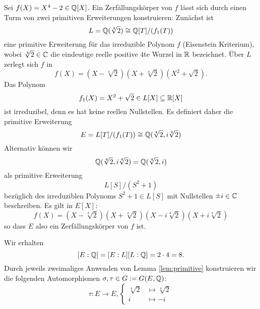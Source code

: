 \documentclass{book}
\begin{document}
\begin{exa}
    \label{exa:x42}
    Sei $f(X) = X^4 - 2 \in \mathbb{Q}[X]$. Ein Zerfällungskörper von $f$ lässt sich
    durch einen Turm von zwei primitiven Erweiterungen konstruieren: Zunächst
    ist 
    \[
        L = \mathbb{Q}(\sqrt[4]{2}) \cong \mathbb{Q}[T]/(f_1(T))
    \]
    eine primitive Erweiterung für das irreduzible Polynom $f$
    (Eisenstein Kriterium), wobei $\sqrt[4]{2} \in \mathbb{C}$ die eindeutige reelle
    positive $4$te Wurzel in $\mathbb{R}$ bezeichnet. Über $L$ zerlegt sich $f$ in 
    \[
        f(X) = (X - \sqrt[4]{2})(X + \sqrt[4]{2}) (X^{2} + \sqrt{2}).
    \]
    Das Polynom 
    \[
        f_1(X) = X^{2} + \sqrt{2} \in L[X] \subseteq \mathbb{R}[X]
    \]
    ist irreduzibel, denn es hat keine reellen Nullstellen. Es definiert daher die primitive Erweiterung
    \[
        E = L[T]/(f_1(T)) \cong \mathbb{Q}(\sqrt[4]{2}, i\sqrt[4]{2})
    \]
    Alternativ können wir 
    \[
        \mathbb{Q}(\sqrt[4]{2}, i\sqrt[4]{2}) = \mathbb{Q}(\sqrt[4]{2}, i)
    \]
    als primitive Erweiterung 
    \[
        L[S]/(S^2 + 1) 
    \]
    bezüglich des irreduziblen Polynoms $S^2 + 1 \in L[S]$ mit
    Nullstellen $\pm i \in \mathbb{C}$ beschreiben. Es gilt in $E[X]$:
    \[
        f(X) = (X - \sqrt[4]{2})(X + \sqrt[4]{2}) (X - i\sqrt[4]{2})(X + i\sqrt[4]{2})
    \]
    so dass $E$ also ein Zerfällungskörper von $f$ ist. 

    Wir erhalten 
    \[
        [E: \mathbb{Q}] = [E: L][L:\mathbb{Q}] = 2 \cdot 4 = 8.
    \]
    Durch jeweils zweimaliges Anwenden von Lemma \ref{lem:primitive}
    konstruieren wir die folgenden Automorphismen
    $\sigma,\tau \in G := G(E, \mathbb{Q})$:
    \[
        \tau: E \to E, \begin{cases} \sqrt[4]{2} & \mapsto \sqrt[4]{2}\\ i & \mapsto -i \end{cases}
    \]


\end{exa}
\end{document}
